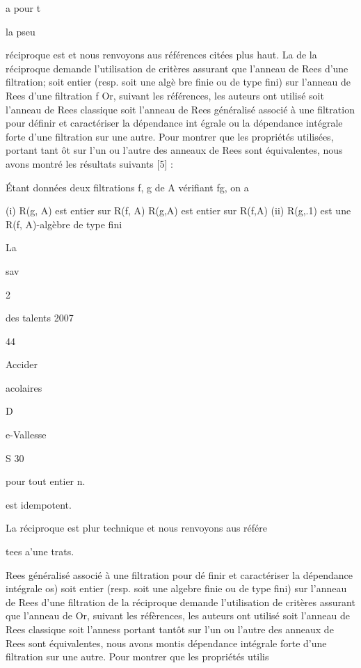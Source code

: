 \documentclass[11pt, twoside]{article}
\begin{document}
a pour t

la pseu

r\'{e}ciproque est et nous renvoyons aus r\'{e}f\'{e}rences cit\'{e}es plus
haut. La de la r\'{e}ciproque demande l'utilisation de crit\`{e}res assurant
que l'anneau de Rees d'une filtration; soit entier (resp. soit une alg\`{e}%
bre finie ou de type fini) sur l'anneau de Rees d'une filtration f Or,
suivant les r\'{e}f\'{e}rences, les auteurs ont utilis\'{e} soit l'anneau de
Rees classique soit l'anneau de Rees g\'{e}n\'{e}ralis\'{e} associ\'{e} \`{a}
une filtration pour d\'{e}finir et caract\'{e}riser la d\'{e}pendance int%
\'{e}grale ou la d\'{e}pendance int\'{e}grale forte d'une filtration sur une
autre. Pour montrer que les propri\'{e}t\'{e}s utilis\'{e}es, portant tant%
\^{o}t sur l'un ou l'autre des anneaux de Rees sont \'{e}quivalentes, nous
avons montr\'{e} les r\'{e}sultats suivants [5] :

\'{E}tant donn\'{e}es deux filtrations f, g de A v\'{e}rifiant fg, on a

(i) R(g, A) est entier sur R(f, A) R(g,A) est entier sur R(f,A) (ii) R(g,.1)
est une R(f, A)-alg\`{e}bre de type fini

La

sav

2

des talents 2007

44

Accider

acolaires

D

e-Vallesse

S 30

pour tout entier n.

est idempotent.

La r\'{e}ciproque est plur technique et nous renvoyons aus r\'{e}f\'{e}re

tees a'une trats.

Rees g\'{e}n\'{e}ralis\'{e} associ\'{e} \`{a} une filtration pour d\'{e}%
finir et caract\'{e}riser la d\'{e}pendance int\'{e}grale os) soit entier
(resp. soit une algebre finie ou de type fini) sur l'anneau de Rees d'une
filtration de la r\'{e}ciproque demande l'utilisation de crit\`{e}res
assurant que l'anneau de Or, suivant les r\'{e}f\`{e}rences, les auteurs ont
utilis\'{e} soit l'anneau de Rees classique soit l'anness portant tant\^{o}t
sur l'un ou l'autre des anneaux de Rees sont \'{e}quivalentes, nous avons
montis d\'{e}pendance int\'{e}grale forte d'une filtration sur une autre.
Pour montrer que les propri\'{e}t\'{e}s utilis
\end{document}

